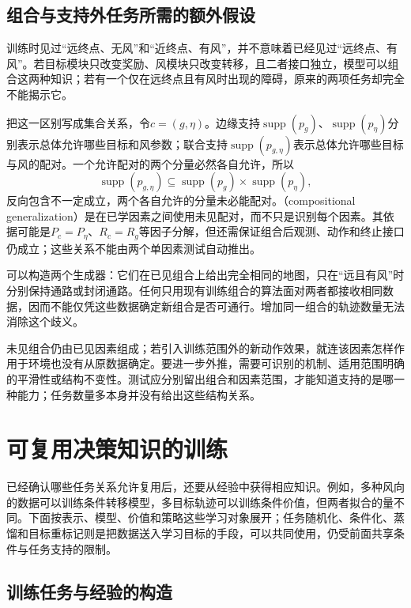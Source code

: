 \subsection{组合与支持外任务所需的额外假设}
\label{sec:rl-transfer-composition}

训练时见过“远终点、无风”和“近终点、有风”，并不意味着已经见过“远终点、有风”。若目标模块只改变奖励、风模块只改变转移，且二者接口独立，模型可以组合这两种知识；若有一个仅在远终点且有风时出现的障碍，原来的两项任务却完全不能揭示它。

把这一区别写成集合关系，令$c=(g,\eta)$。边缘支持$\operatorname{supp}(p_g)$、$\operatorname{supp}(p_\eta)$分别表示总体允许哪些目标和风参数；联合支持$\operatorname{supp}(p_{g,\eta})$表示总体允许哪些目标与风的配对。一个允许配对的两个分量必然各自允许，所以
\[
 \operatorname{supp}(p_{g,\eta})
 \subseteq \operatorname{supp}(p_g)\times\operatorname{supp}(p_\eta),
\]
反向包含不一定成立，两个各自允许的分量未必能配对。（compositional generalization）是在已学因素之间使用未见配对，而不只是识别每个因素。其依据可能是$P_c=P_\eta$、$R_c=R_g$等因子分解，但还需保证组合后观测、动作和终止接口仍成立；这些关系不能由两个单因素测试自动推出。

可以构造两个生成器：它们在已见组合上给出完全相同的地图，只在“远且有风”时分别保持通路或封闭通路。任何只用现有训练组合的算法面对两者都接收相同数据，因而不能仅凭这些数据确定新组合是否可通行。增加同一组合的轨迹数量无法消除这个歧义。

未见组合仍由已见因素组成；若引入训练范围外的新动作效果，就连该因素怎样作用于环境也没有从原数据确定。要进一步外推，需要可识别的机制、适用范围明确的平滑性或结构不变性。测试应分别留出组合和因素范围，才能知道支持的是哪一种能力；任务数量多本身并没有给出这些结构关系。

\section{可复用决策知识的训练}
\label{sec:rl-transfer-training}

已经确认哪些任务关系允许复用后，还要从经验中获得相应知识。例如，多种风向的数据可以训练条件转移模型，多目标轨迹可以训练条件价值，但两者拟合的量不同。下面按表示、模型、价值和策略这些学习对象展开；任务随机化、条件化、蒸馏和目标重标记则是把数据送入学习目标的手段，可以共同使用，仍受前面共享条件与任务支持的限制。

\subsection{训练任务与经验的构造}
\label{sec:rl-transfer-data}

